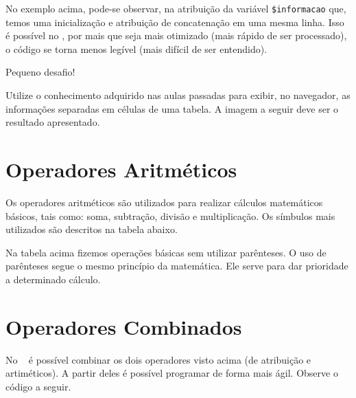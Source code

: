

No exemplo acima, pode-se observar, na atribuição da variável \texttt{\$informacao} que, 
temos uma inicialização e atribuição de concatenação em uma mesma linha. Isso é possível
no \php, por mais que seja mais otimizado (mais rápido de ser processado), o código se
torna menos legível (mais difícil de ser entendido).

{\Large Pequeno desafio!}

Utilize o conhecimento adquirido nas aulas passadas para exibir, no navegador, as informações
separadas em células de uma tabela. A imagem a seguir deve ser o resultado apresentado. 


\section{Operadores Aritméticos}
\label{operadores-aritmeticos}

Os operadores aritméticos são utilizados para realizar cálculos matemáticos básicos, tais
como: soma, subtração, divisão e multiplicação. Os símbulos mais utilizados são descritos
na tabela abaixo.



Na tabela acima fizemos operações básicas sem utilizar parênteses. O uso de parênteses
segue o mesmo princípio da matemática. Ele serve para dar prioridade a determinado
cálculo.

\section{Operadores Combinados}
\label{operadores-combinados}

No \php~ é possível combinar os dois operadores visto acima (de atribuição e artiméticos).
A partir deles é possível programar de forma mais ágil. Observe o código a seguir.

\begin{multicols}{2}

  
  \columnbreak

  

\end{multicols}

